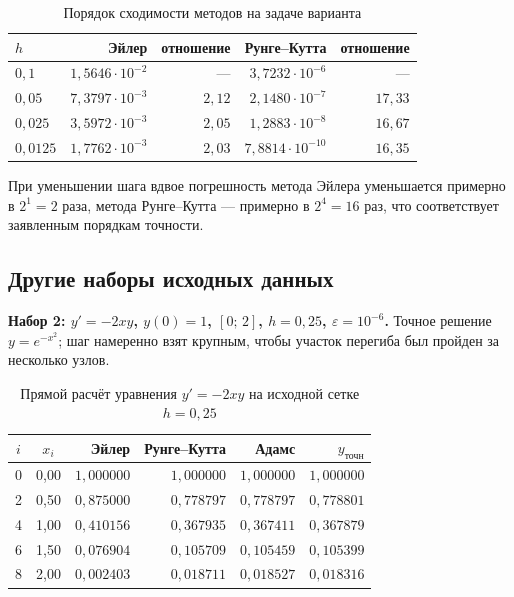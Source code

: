\documentclass[12pt,a4paper]{article}
\begin{document}
\begin{table}[H]\centering\small
\caption{Порядок сходимости методов на задаче варианта}
\begin{tabular}{lrrrr}\toprule
$h$ & Эйлер & отношение & Рунге--Кутта & отношение\\\midrule
$0{,}1$    & $1{,}5646\cdot10^{-2}$ & --- & $3{,}7232\cdot10^{-6}$ & ---\\
$0{,}05$   & $7{,}3797\cdot10^{-3}$ & $2{,}12$ & $2{,}1480\cdot10^{-7}$ & $17{,}33$\\
$0{,}025$  & $3{,}5972\cdot10^{-3}$ & $2{,}05$ & $1{,}2883\cdot10^{-8}$ & $16{,}67$\\
$0{,}0125$ & $1{,}7762\cdot10^{-3}$ & $2{,}03$ & $7{,}8814\cdot10^{-10}$ & $16{,}35$\\\bottomrule
\end{tabular}\end{table}

При уменьшении шага вдвое погрешность метода Эйлера уменьшается примерно
в $2^1=2$ раза, метода Рунге--Кутта --- примерно в $2^4=16$ раз, что
соответствует заявленным порядкам точности.

\subsection{Другие наборы исходных данных}
\textbf{Набор 2: $y'=-2xy$, $y(0)=1$, $[0;\,2]$, $h=0{,}25$,
$\varepsilon=10^{-6}$.} Точное решение $y=e^{-x^2}$; шаг намеренно взят
крупным, чтобы участок перегиба был пройден за несколько узлов.

\begin{table}[H]\centering\small
\caption{Прямой расчёт уравнения $y'=-2xy$ на исходной сетке $h=0{,}25$}
\begin{tabular}{ccrrrr}\toprule
$i$ & $x_i$ & Эйлер & Рунге--Кутта & Адамс & $y_{\text{точн}}$\\\midrule
0 & 0{,}00 & $1{,}000000$ & $1{,}000000$ & $1{,}000000$ & $1{,}000000$\\
2 & 0{,}50 & $0{,}875000$ & $0{,}778797$ & $0{,}778797$ & $0{,}778801$\\
4 & 1{,}00 & $0{,}410156$ & $0{,}367935$ & $0{,}367411$ & $0{,}367879$\\
6 & 1{,}50 & $0{,}076904$ & $0{,}105709$ & $0{,}105459$ & $0{,}105399$\\
8 & 2{,}00 & $0{,}002403$ & $0{,}018711$ & $0{,}018527$ & $0{,}018316$\\\bottomrule
\end{tabular}\end{table}
\end{document}
